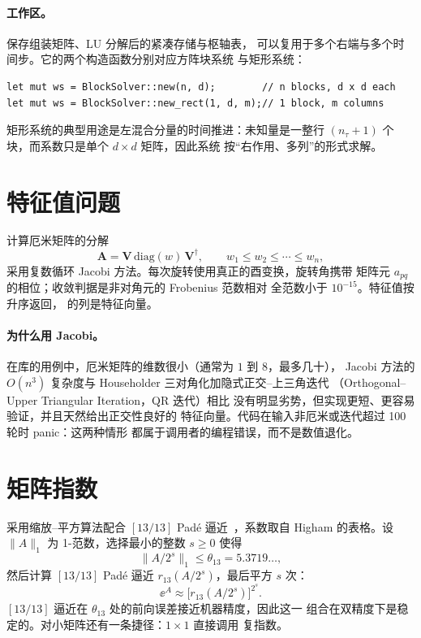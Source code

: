 \paragraph{工作区。}
 保存组装矩阵、LU 分解后的紧凑存储与枢轴表，
可以复用于多个右端与多个时间步。它的两个构造函数分别对应方阵块系统
与矩形系统：
\begin{lstlisting}[numbers=none]
let mut ws = BlockSolver::new(n, d);        // n blocks, d x d each
let mut ws = BlockSolver::new_rect(1, d, m);// 1 block, m columns
\end{lstlisting}
矩形系统的典型用途是左混合分量的时间推进：未知量是一整行
$(n_\tau+1)$ 个块，而系数只是单个 $d\times d$ 矩阵，因此系统
按“右作用、多列”的形式求解。

\section{特征值问题}
\label{sec:eigh}

 计算厄米矩阵的分解
\begin{equation}
    \bm{A} = \bm{V}\,\mathrm{diag}(w)\,\bm{V}^{\dagger},
    \qquad w_1\le w_2\le\cdots\le w_n ,
    \label{eq:eigh}
\end{equation}
采用复数循环 Jacobi 方法。每次旋转使用真正的酉变换，旋转角携带
矩阵元 $a_{pq}$ 的相位；收敛判据是非对角元的 Frobenius 范数相对
全范数小于 $10^{-15}$。特征值按升序返回， 的列是特征向量。

\paragraph{为什么用 Jacobi。}
在库的用例中，厄米矩阵的维数很小（通常为 $1$ 到 $8$，最多几十），
Jacobi 方法的 $O(n^3)$ 复杂度与 Householder 三对角化加隐式正交--上三角迭代
（Orthogonal--Upper Triangular Iteration，QR 迭代）相比
没有明显劣势，但实现更短、更容易验证，并且天然给出正交性良好的
特征向量。代码在输入非厄米或迭代超过 100 轮时 panic：这两种情形
都属于调用者的编程错误，而不是数值退化。

\section{矩阵指数}
\label{sec:expm}

 采用缩放--平方算法配合 $[13/13]$ Padé 逼近~\cite{higham2005}，系数取自
Higham 的表格。设 $\|A\|_1$ 为 1-范数，选择最小的整数 $s\ge 0$ 使得
\begin{equation}
    \|A/2^s\|_1 \le \theta_{13} = 5.3719\ldots ,
    \label{eq:scaling}
\end{equation}
然后计算 $[13/13]$ Padé 逼近 $r_{13}(A/2^s)$，最后平方 $s$ 次：
\begin{equation}
    \ee^{A} \approx \big[r_{13}(A/2^s)\big]^{2^s}.
    \label{eq:scaling-squaring}
\end{equation}
$[13/13]$ 逼近在 $\theta_{13}$ 处的前向误差接近机器精度，因此这一
组合在双精度下是稳定的。对小矩阵还有一条捷径：$1\times1$ 直接调用
复指数。

